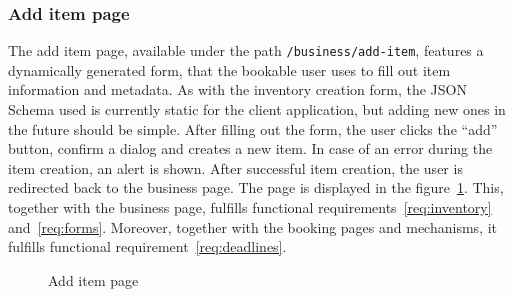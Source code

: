 \subsubsection{Add item page}

The add item page, available under the path \texttt{/business/add-item}, features a dynamically generated form, that the bookable user uses to fill out item information and metadata. As with the inventory creation form, the JSON Schema used is currently static for the client application, but adding new ones in the future should be simple. After filling out the form, the user clicks the \enquote{add} button, confirm a dialog and creates a new item. In case of an error during the item creation, an alert is shown. After successful item creation, the user is redirected back to the business page. The page is displayed in the figure~\ref{fig:add_item_page}. This, together with the business page, fulfills functional requirements~\ref{req:inventory} and~\ref{req:forms}. Moreover, together with the booking pages and mechanisms, it fulfills functional requirement~\ref{req:deadlines}.

\begin{figure}
    \centering
    \caption[Add item page]{Add item page}
    \label{fig:add_item_page}
\end{figure}

